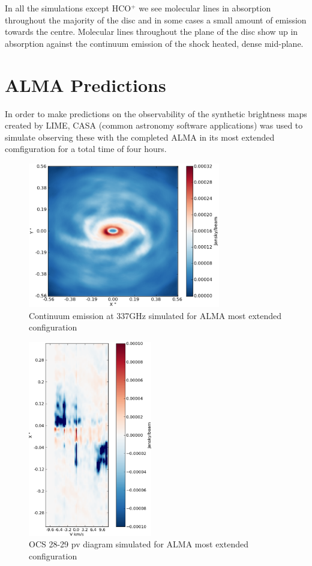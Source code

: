 \documentclass[useAMS,usenatbib]{mn2e}
\begin{document}
In all the simulations except HCO$^+$ we see molecular lines in absorption throughout the majority of the disc and in some cases a small amount of emission towards the centre. Molecular lines throughout the plane of the disc show up in absorption against the continuum emission of the shock heated, dense mid-plane. 





\section{ALMA Predictions} \label{sec:alma_predictions}

In order to make predictions on the observability of the synthetic brightness maps created by LIME, CASA (common astronomy software applications) was used to simulate observing these with the completed ALMA in its most extended comfiguration for a total time of four hours.

\begin{figure}
 \includegraphics[width=84mm]{Figures/sim/casa_cont_337GHz.eps}

 \caption{Continuum emission at 337GHz simulated for ALMA most extended configuration}
\end{figure}

\begin{figure}
 \includegraphics[width=54mm]{Figures/sim/casa_imageOCS_28-27_30deg_composite_ALMAwidth_big_dirty_PV_centre.eps}

 \caption{OCS 28-29 pv diagram simulated for ALMA most extended configuration}
\end{figure}
\end{document}
